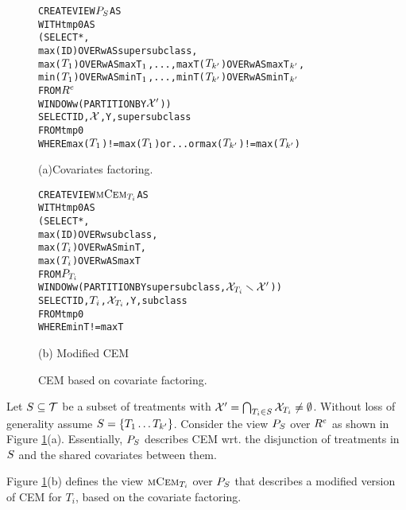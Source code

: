 \begin{figure}
\begin{alltt} \scriptsize
CREATE VIEW \(\prp\) AS
WITH tmp0 AS
  (SELECT *,
          max(ID) OVER w AS supersubclass,
          max(\(T\sb1\)) OVER w AS maxT\(\sb1\),..., maxT(\(T\sb{k'}\)) OVER w AS maxT\(\sb{k'}\),
          min(\(T\sb1\)) OVER w AS minT\(\sb1\),..., minT(\(T\sb{k'}\)) OVER w AS minT\(\sb{k'}\)
   FROM \(\rele\)
   WINDOW w (PARTITION BY \(\ccvin\)))
SELECT ID, \(\ccvu\), Y , supersubclass
FROM tmp0
WHERE max(\(T\sb1\))!=max(\(T\sb{1}\)) or ... or  max(\(T\sb{k'}\))!=max(\(T\sb{k'}\))
\end{alltt} \vspace{-.2cm} \hspace{2.5cm}
(a)Covariates factoring.
\vspace{-.1cm}
\begin{alltt} \scriptsize
CREATE VIEW \(\mcem\) AS
WITH tmp0 AS
  (SELECT *,
          max(ID) OVER w    subclass,
          max(\(T\sb{i}\))  OVER w AS minT,
          max(\(T\sb{i}\))  OVER w AS maxT
   FROM \(\prpi\)
   WINDOW w (PARTITION BY supersubclass, \( \ccv\sb{T\sb{i}} \smallsetminus \ccvin  \)))
SELECT ID,\(T\sb{i}\),\(\ccv\sb{T\sb{i}}\), Y, subclass
FROM tmp0
WHERE minT!=maxT
\end{alltt}
\vspace{-.2cm} \hspace{3cm}
(b) Modified CEM
\caption{CEM based on covariate factoring.}\label{fig:cf}
\end{figure}






Let $S \subseteq {{\mathcal{T}}}$ be a subset of treatments
with ${{\mathcal{X}'}}= \bigcap_{T_i \in S} {{\mathcal{X}}}_{T_i} \not = \emptyset$. Without loss of generality assume $S=\{T_1 \ldots T_{k'}\}$.
 Consider the view ${{P}_{S}}$ over ${{R}^e}$ as shown in Figure \ref{fig:cf}(a). Essentially, ${{P}_{S}}$ describes CEM wrt. the disjunction
 of treatments in $S$ and the shared covariates between them.   Figure \ref{fig:cf}(b) defines the view ${\textsc{mCem}_{T_i}}$ over ${{P}_{S}}$ that describes a modified version of CEM for $T_i$,
based on the covariate factoring.  

